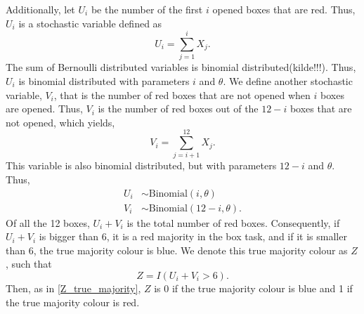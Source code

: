 Additionally, let $U_i$ be the number of the first $i$ opened boxes that are red. Thus, $U_i$ is a stochastic variable defined as
\begin{equation*}
    U_i = \sum_{j=1}^{i} X_j. 
\end{equation*}
The sum of Bernoulli distributed variables is binomial distributed(kilde!!!). Thus, $U_i$ is binomial distributed with parameters $i$ and $\theta$. We define another stochastic variable, $V_i$, that is the number of red boxes that are not opened when $i$ boxes are opened. Thus, $V_i$ is the number of red boxes out of the $12-i$ boxes that are not opened, which yields,
\begin{equation*}
    V_i = \sum_{j=i+1}^{12} X_j.
\end{equation*}
This variable is also binomial distributed, but with parameters $12-i$ and $\theta$. Thus,
\begin{equation*}
    \begin{aligned}
        U_i &\sim \text{Binomial}(i,\theta)\\
        V_i &\sim \text{Binomial}(12-i,\theta).
    \end{aligned}
\end{equation*}
Of all the 12 boxes, $U_i+V_i$ is the total number of red boxes.
Consequently, if $U_i+V_i$ is bigger than 6, it is a red majority in the box task, and if it is smaller than 6, the true majority colour is blue. We denote this true majority colour as $Z$, such that
\begin{equation*}
    Z = I(U_i+V_i>6).
\end{equation*}
Then, as in \eqref{Z_true_majority}, $Z$ is 0 if the true majority colour is blue and 1 if the true majority colour is red. 




